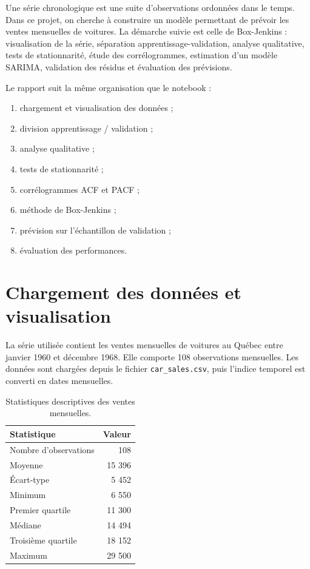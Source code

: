 \documentclass[12pt,a4paper]{article}
\begin{document}
Une série chronologique est une suite d'observations ordonnées dans le temps.
Dans ce projet, on cherche à construire un modèle permettant de prévoir les ventes
mensuelles de voitures. La démarche suivie est celle de Box-Jenkins : visualisation
de la série, séparation apprentissage-validation, analyse qualitative, tests de
stationnarité, étude des corrélogrammes, estimation d'un modèle SARIMA, validation
des résidus et évaluation des prévisions.

Le rapport suit la même organisation que le notebook :
\begin{enumerate}
    \item chargement et visualisation des données ;
    \item division apprentissage / validation ;
    \item analyse qualitative ;
    \item tests de stationnarité ;
    \item corrélogrammes ACF et PACF ;
    \item méthode de Box-Jenkins ;
    \item prévision sur l'échantillon de validation ;
    \item évaluation des performances.
\end{enumerate}

\section{Chargement des données et visualisation}

La série utilisée contient les ventes mensuelles de voitures au Québec entre janvier
1960 et décembre 1968. Elle comporte 108 observations mensuelles. Les données sont
chargées depuis le fichier \texttt{car\_sales.csv}, puis l'indice temporel est
converti en dates mensuelles.

\begin{table}[H]
\centering
\begin{tabular}{lr}
\toprule
Statistique & Valeur \\
\midrule
Nombre d'observations & 108 \\
Moyenne & 15 396 \\
Écart-type & 5 452 \\
Minimum & 6 550 \\
Premier quartile & 11 300 \\
Médiane & 14 494 \\
Troisième quartile & 18 152 \\
Maximum & 29 500 \\
\bottomrule
\end{tabular}
\caption{Statistiques descriptives des ventes mensuelles.}
\end{table}
\end{document}
